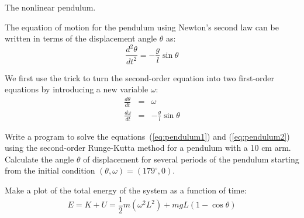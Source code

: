 \documentclass[10pt]{article}
\begin{document}
The nonlinear pendulum.

The equation of motion for the pendulum using Newton's second law can be written in terms of the displacement angle $\theta$ as:
%
\begin{equation}\label{eq:pendulum}
\frac{d^2\theta}{dt^2} = - \frac{g}{l} \sin \theta
\end{equation}

We first use the trick to turn the second-order equation into two first-order equations by introducing a new variable $\omega$:
%
\begin{eqnarray}
\frac{d\theta}{dt} & = & \omega \label{eq:pendulum1}\\ 
\frac{d\omega}{dt} & = & -\frac{g}{l} \sin \theta \label{eq:pendulum2}
\end{eqnarray}

\begin{question}
Write a program to solve the equations~(\ref{eq:pendulum1}) and (\ref{eq:pendulum2}) using the second-order Runge-Kutta method for a pendulum with a 10 cm arm.
Calculate the angle $\theta$ of displacement for several periods of the pendulum starting from the initial condition $(\theta, \omega) = (179^\circ, 0)$.
\end{question}

\begin{question}
Make a plot of the total energy of the system as a function of time:
%
\begin{equation}
E = K + U = \frac{1}{2} m (\omega^2 L^2) + m g L (1 - \cos \theta) 
\end{equation}
\end{question}
\end{document}
